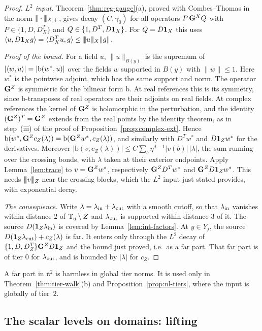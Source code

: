 \begin{proof}
\emph{$L^2$ input.} Theorem~\ref{thm:reg-gauge}(a), proved with Combes--Thomas in the norm $|\!|\!|\cdot|\!|\!|_{X,+}$, gives decay $(C,\gamma_0)$ for all operators $P\,\mathbf G^X Q$ with $P\in\{1,D,D^T_X\}$ and $Q\in\{1,D^T,D\mathbf 1_X\}$. For $Q=D\mathbf 1_X$ this uses $\langle u,D\mathbf 1_Xg\rangle=\langle D^T_Xu,g\rangle\le|\!|\!|u|\!|\!|_X\|g\|$.

\emph{Proof of the bound.} For a field $u$, $\|u\|_{B(y)}$ is the supremum of $|\langle w,u\rangle|=|\mathrm b(w^*,u)|$ over the fields $w$ supported in $B(y)$ with $\|w\|\le1$. Here $w^*$ is the pointwise adjoint, which has the same support and norm. The operator $\mathbf G^Z$ is symmetric for the bilinear form $\mathrm b$. At real references this is its symmetry, since $\mathrm b$-transposes of real operators are their adjoints on real fields. At complex references the kernel of $\mathbf G^Z$ is holomorphic in the perturbation, and the identity $(\mathbf G^Z)^T=\mathbf G^Z$ extends from the real points by the identity theorem, as in step~(iii) of the proof of Proposition~\ref{prop:complex-ext}. Hence $\mathrm b(w^*,\mathbf G^Zc_Z(\lambda))=\mathrm b(\mathbf G^Zw^*,c_Z(\lambda))$, and similarly with $D^Tw^*$ and $D\mathbf 1_Zw^*$ for the derivatives. Moreover $|\mathrm b(v,c_Z(\lambda))|\le C\sum_b\eta^{d-1}|v(b)|\,|\lambda|$, the sum running over the crossing bonds, with $\lambda$ taken at their exterior endpoints. Apply Lemma~\ref{lem:trace} to $v=\mathbf G^Zw^*$, respectively $\mathbf G^ZD^Tw^*$ and $\mathbf G^ZD\mathbf 1_Zw^*$. This needs $|\!|\!|v|\!|\!|_Z$ near the crossing blocks, which the $L^2$ input just stated provides, with exponential decay.

\emph{The consequence.} Write $\lambda=\lambda_{\rm in}+\lambda_{\rm cut}$ with a smooth cutoff, so that $\lambda_{\rm in}$ vanishes within distance $2$ of $\mathbb T_\eta\setminus Z$ and $\lambda_{\rm cut}$ is supported within distance $3$ of it. The source $D(\mathbf 1_Z\lambda_{\rm in})$ is covered by Lemma~\ref{lem:int-factors}. At $y\in Y_j$, the source $D(\mathbf 1_Z\lambda_{\rm cut})+c_Z(\lambda)$ is far. It enters only through the $L^2$ decay of $\{1,D,D^T_Z\}\mathbf G^ZD\mathbf 1_Z$ and the bound just proved, i.e.\ as a far part. That far part is of tier $0$ for $\lambda_{\rm cut}$, and is bounded by $|\lambda|$ for $c_Z$.
\end{proof}

A far part in $\mathfrak n^2$ is harmless in global tier norms. It is used only in Theorem~\ref{thm:tier-walk}(b) and Proposition~\ref{prop:nl-tiers}, where the input is globally of tier~$2$.

\subsection{The scalar levels on domains: lifting}\label{ss:44.3}

